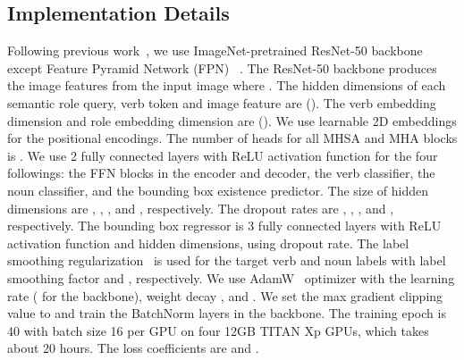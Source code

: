 \begin{table}[t]
\centering
\caption{Requirements for each metric.} 
\centering 
\label{table:metric}
\end{table}

\subsection{Implementation Details}
\label{exp:detail}

Following previous work~\cite{pratt2020grounded}, we use ImageNet-pretrained ResNet-50 backbone~\cite{resnet} except Feature Pyramid Network (FPN) ~\cite{lin2017_fpn}.
The ResNet-50 backbone produces the image features  from the input image where .
The hidden dimensions of each semantic role query, verb token and image feature are  ().
The verb embedding dimension and role embedding dimension are  ().
We use learnable 2D embeddings for the positional encodings.
The number of heads for all MHSA and MHA blocks is .
We use 2 fully connected layers with ReLU activation function for the four followings: the FFN blocks in the encoder and decoder, the verb classifier, the noun classifier, and the bounding box existence predictor.
The size of hidden dimensions are , , , and , respectively.
The dropout rates are , , , and , respectively.
The bounding box regressor is 3 fully connected layers with ReLU activation function and  hidden dimensions, using  dropout rate.
The label smoothing regularization~\cite{szegedy2016rethinking} is used for the target verb and noun labels with 
label smoothing factor  and , respectively.
We use AdamW~\cite{loshchilov2018decoupled} optimizer with the learning rate  ( for the backbone),
weight decay ,  and .
We set the max gradient clipping value to  and train the BatchNorm layers in the backbone.
The training epoch is 40 with batch size 16 per GPU on four 12GB TITAN Xp GPUs, which takes about 20 hours.
The loss coefficients are  and .

